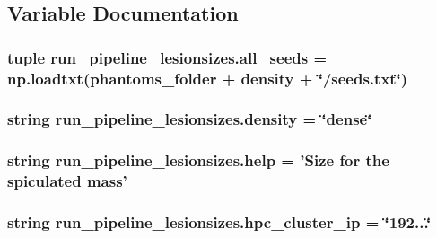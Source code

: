 \subsection{Variable Documentation}
\hypertarget{namespacerun__pipeline__lesionsizes_a17e351f66c99883c1fc46e398ddb89db}{
\subsubsection[{all\-\_\-seeds}]{\setlength{\rightskip}{0pt plus 5cm}tuple run\-\_\-pipeline\-\_\-lesionsizes.\-all\-\_\-seeds = np.\-loadtxt({\bf phantoms\-\_\-folder} + {\bf density} + \char`\"{}/seeds.\-txt\char`\"{})}}\label{namespacerun__pipeline__lesionsizes_a17e351f66c99883c1fc46e398ddb89db}
\hypertarget{namespacerun__pipeline__lesionsizes_ae2a3f1b39ec7dc28c3aa3bc223432ba8}{
\subsubsection[{density}]{\setlength{\rightskip}{0pt plus 5cm}string run\-\_\-pipeline\-\_\-lesionsizes.\-density = \char`\"{}dense\char`\"{}}}\label{namespacerun__pipeline__lesionsizes_ae2a3f1b39ec7dc28c3aa3bc223432ba8}
\hypertarget{namespacerun__pipeline__lesionsizes_aa88ad88d9cf23592a308b4d4e2ed6ebf}{
\subsubsection[{help}]{\setlength{\rightskip}{0pt plus 5cm}string run\-\_\-pipeline\-\_\-lesionsizes.\-help = 'Size for the spiculated mass'}}\label{namespacerun__pipeline__lesionsizes_aa88ad88d9cf23592a308b4d4e2ed6ebf}
\hypertarget{namespacerun__pipeline__lesionsizes_a459355f58091ae51752cbc1b81939a7d}{
\subsubsection[{hpc\-\_\-cluster\-\_\-ip}]{\setlength{\rightskip}{0pt plus 5cm}string run\-\_\-pipeline\-\_\-lesionsizes.\-hpc\-\_\-cluster\-\_\-ip = \char`\"{}192...\char`\"{}}}\label{namespacerun__pipeline__lesionsizes_a459355f58091ae51752cbc1b81939a7d}
